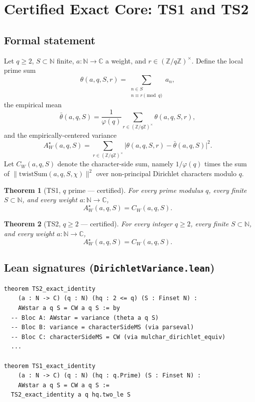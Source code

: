 \documentclass[11pt,a4paper]{article}
\newtheorem{theorem}{Theorem}[section]
\theoremstyle{definition}
\newcommand{\AWs}{A_W^{\star}}
\newcommand{\CWq}{C_W}
\begin{document}
\section{Certified Exact Core: TS1 and TS2}\label{sec:exact-core}

\subsection{Formal statement}

Let $q \geq 2$, $S \subset \mathbb{N}$ finite, $a : \mathbb{N} \to \mathbb{C}$ a weight, and $r \in (\mathbb{Z}/q\mathbb{Z})^\times$. Define the local prime sum
\[
  \theta(a, q, S, r) = \sum_{\substack{n \in S \\ n \equiv r \pmod q}} a_n,
\]
the empirical mean
\[
  \bar\theta(a, q, S) = \frac{1}{\varphi(q)} \sum_{r \in (\mathbb{Z}/q\mathbb{Z})^\times} \theta(a, q, S, r),
\]
and the empirically-centered variance
\[
  \AWs(a, q, S) = \sum_{r \in (\mathbb{Z}/q\mathbb{Z})^\times} \bigl|\theta(a, q, S, r) - \bar\theta(a, q, S)\bigr|^2.
\]
Let $\CWq(a, q, S)$ denote the character-side sum, namely $1/\varphi(q)$ times the sum of $\|\mathrm{twistSum}(a, q, S, \chi)\|^2$ over non-principal Dirichlet characters modulo $q$.

\begin{theorem}[TS1, $q$ prime --- certified]\label{thm:TS1}
For every prime modulus $q$, every finite $S \subset \mathbb{N}$, and every weight $a : \mathbb{N} \to \mathbb{C}$,
\[
  \AWs(a, q, S) = \CWq(a, q, S).
\]
\end{theorem}

\begin{theorem}[TS2, $q \geq 2$ --- certified]\label{thm:TS2}
For every integer $q \geq 2$, every finite $S \subset \mathbb{N}$, and every weight $a : \mathbb{N} \to \mathbb{C}$,
\[
  \AWs(a, q, S) = \CWq(a, q, S).
\]
\end{theorem}

\subsection{Lean signatures (\texttt{DirichletVariance.lean})}

\begin{lstlisting}
theorem TS2_exact_identity
    (a : N -> C) (q : N) (hq : 2 <= q) (S : Finset N) :
    AWstar a q S = CW a q S := by
  -- Bloc A: AWstar = variance (theta a q S)
  -- Bloc B: variance = characterSideMS (via parseval)
  -- Bloc C: characterSideMS = CW (via mulchar_dirichlet_equiv)
  ...

theorem TS1_exact_identity
    (a : N -> C) (q : N) (hq : q.Prime) (S : Finset N) :
    AWstar a q S = CW a q S :=
  TS2_exact_identity a q hq.two_le S
\end{lstlisting}
\end{document}
